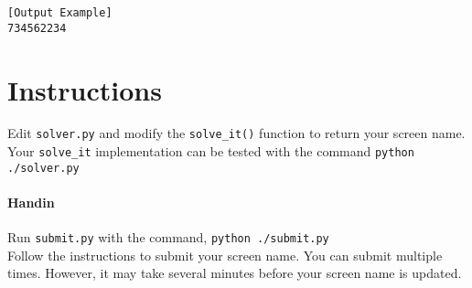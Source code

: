 \documentclass[11pt]{article}
\begin{document}
\begin{verbatim}[Output Example]
734562234
\end{verbatim}

\section{Instructions}

Edit \texttt{solver.py} and modify the \texttt{solve\_it()} function to return your screen name.  Your \texttt{solve\_it} implementation can be tested with the command \texttt{python ./solver.py}

\paragraph{Handin}
Run \texttt{submit.py} with the command,
\texttt{python ./submit.py}\\
Follow the instructions to submit your screen name.  You can submit multiple times.  However, it may take several minutes before your screen name is updated.




\end{document}
